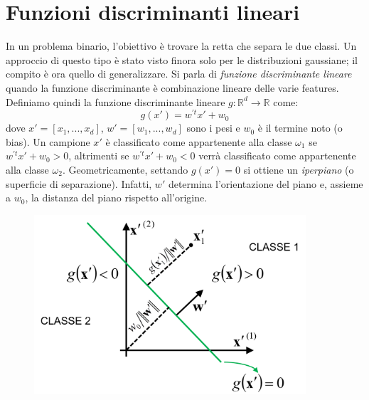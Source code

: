 \documentclass[a4paper,oneside,titlepage]{book}
\begin{document}
\section{Funzioni discriminanti lineari}
In un problema binario, l’obiettivo è trovare la retta che separa le due classi. Un approccio di questo tipo è stato visto finora solo per le distribuzioni gaussiane; il compito è ora quello di generalizzare. Si parla di \textit{funzione discriminante lineare} quando la funzione discriminante è combinazione lineare delle varie features. Definiamo quindi la funzione discriminante lineare $g: \mathbb{R}^d \rightarrow \mathbb{R}$ come:
\[ g(x') = w^{'t} x' + w_0 \]
dove $x'=[x_1,...,x_d]$, $w'=[w_1,...,w_d]$ sono i pesi e $w_0$ è il termine noto (o bias). Un campione $x'$ è classificato come appartenente alla classe $\omega_1$ se $w^{'t} x' + w_0 > 0$, altrimenti se $w^{'t} x' + w_0 < 0$ verrà classificato come appartenente alla classe $\omega_2$. Geometricamente, settando $g(x')=0$ si ottiene un \textit{iperpiano} (o superficie di separazione). Infatti, $w'$ determina l'orientazione del piano e, assieme a $w_0$, la distanza del piano rispetto all'origine.
\begin{figure}[htp]
	\centering
	\includegraphics[width=0.9\textwidth]{svm1.png}
\end{figure}
\end{document}

